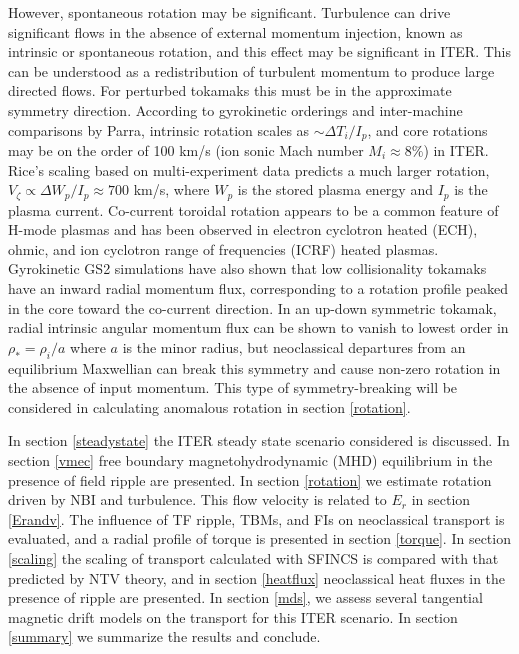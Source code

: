 \documentclass[aip, pop, preprint]{revtex4-1}
\numberwithin{figure}{section}
\numberwithin{equation}{section}
\begin{document}
However, spontaneous rotation may be significant. Turbulence can drive significant flows in the absence of external momentum injection, known as intrinsic or spontaneous rotation, and this effect may be significant in ITER. This can be understood as a redistribution of turbulent momentum to produce large directed flows. For perturbed tokamaks this must be in the approximate symmetry direction. According to gyrokinetic orderings and inter-machine comparisons by Parra,\cite{Parra2012} intrinsic rotation scales as $\sim \Delta T_i/I_p$, and core rotations may be on the order of 100 km/s (ion sonic Mach number $M_i \approx 8\%$) in ITER. Rice's scaling based on multi-experiment data \cite{Rice2007} predicts a much larger rotation, $V_{\zeta} \propto \Delta W_p/I_p \approx 700$ km/s, where $W_p$ is the stored plasma energy and $I_p$ is the plasma current. Co-current toroidal rotation appears to be a common feature of H-mode plasmas and has been observed in electron cyclotron heated (ECH),\cite{DeGrassie2007} ohmic,\cite{DeGrassie2007} and ion cyclotron range of frequencies (ICRF) \cite{Noterdaeme2003} heated plasmas. Gyrokinetic GS2 simulations have also shown that low collisionality tokamaks have an inward radial momentum flux, corresponding to a rotation profile peaked in the core toward the co-current direction.\cite{Barnes2013} In an up-down symmetric tokamak, radial intrinsic angular momentum flux can be shown to vanish to lowest order in $\rho_* = \rho_i/a$ where $a$ is the minor radius, but neoclassical departures from an equilibrium Maxwellian can break this symmetry and cause non-zero rotation in the absence of input momentum.\cite{Barnes2013} This type of symmetry-breaking will be considered in calculating anomalous rotation in section \ref{rotation}. 

In section \ref{steadystate} the ITER steady state scenario considered is discussed. In section \ref{vmec} free boundary magnetohydrodynamic (MHD) equilibrium in the presence of field ripple are presented. In section \ref{rotation} we estimate rotation driven by NBI and turbulence. This flow velocity is related to $E_r$ in section \ref{Erandv}. The influence of TF ripple, TBMs, and FIs on neoclassical transport is evaluated, and a radial profile of torque is presented in section \ref{torque}. In section \ref{scaling} the scaling of transport calculated with SFINCS is compared with that predicted by NTV theory, and in section \ref{heatflux} neoclassical heat fluxes in the presence of ripple are presented. In section \ref{mds}, we assess several tangential magnetic drift models on the transport for this ITER scenario. In section \ref{summary} we summarize the results and conclude.
\end{document}
